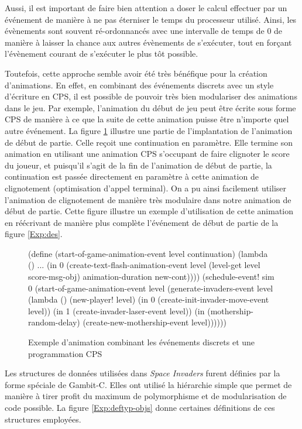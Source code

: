 \documentclass[12pt,oneside,letterpaper,francais]{book}
\newcommand{\si}{{\textit{Space Invaders }}}
\newcommand{\scheme}[1]{\selectlanguage{english}{\tt #1}\selectlanguage{french}}
\begin{document}
Aussi, il est important de faire bien attention a doser le calcul
effectuer par un événement de manière à ne pas éterniser le temps du
processeur utilisé. Ainsi, les évènements sont souvent ré-ordonnancés
avec une intervalle de temps de 0 de manière à laisser la chance aux
autres évènements de s'exécuter, tout en forçant l'évènement courant
de s'exécuter le plus tôt possible.

Toutefois, cette approche semble avoir été très bénéfique pour la
création d'animations. En effet, en combinant des événements discrets
avec un style d'écriture en CPS, il est possible de pouvoir très bien
modulariser des animations dans le jeu. Par exemple, l'animation du
début de jeu peut être écrite sous forme CPS de manière à ce que la
suite de cette animation puisse être n'importe quel autre
événement. La figure \ref{Exp:anim} illustre une partie de
l'implantation de l'animation de début de partie. Celle reçoit une
continuation en paramètre. Elle termine son animation en utilisant une
animation CPS s'occupant de faire clignoter le score du joueur, et
puisqu'il s'agit de la fin de l'animation de début de partie, la
continuation est passée directement en paramètre à cette animation de
clignotement (optimisation d'appel terminal). On a pu ainsi facilement
utiliser l'animation de clignotement de manière très modulaire dans
notre animation de début de partie. Cette figure illustre un exemple
d'utilisation de cette animation en réécrivant de manière plus
complète l'événement de début de partie de la figure \ref{Exp:des}.

\begin{figure}[htb!]
  \begin{schemecode}
(define (start-of-game-animation-event level continuation)
  (lambda ()
    ...
    (in 0 (create-text-flash-animation-event level
            (level-get level score-msg-obj)
            animation-duration new-cont))))
(schedule-event! sim 0
  (start-of-game-animation-event level
   (generate-invaders-event level
    (lambda ()
      (new-player! level)
      (in 0 (create-init-invader-move-event level))
      (in 1 (create-invader-laser-event level))
      (in (mothership-random-delay)
          (create-new-mothership-event level))))))
  \end{schemecode}
  \caption{Exemple d'animation combinant les événements discrets et
    une programmation CPS}
  \label{Exp:anim}
\end{figure}

Les structures de données utilisées dans \si furent définies par la
forme spéciale \scheme{define-type} de Gambit-C. Elles ont utilisé la
hiérarchie simple que permet \scheme{define-type} de manière à tirer
profit du maximum de polymorphisme et de modularisation de code
possible. La figure \ref{Exp:deftyp-objs} donne certaines définitions
de ces structures employées. 
\end{document}
